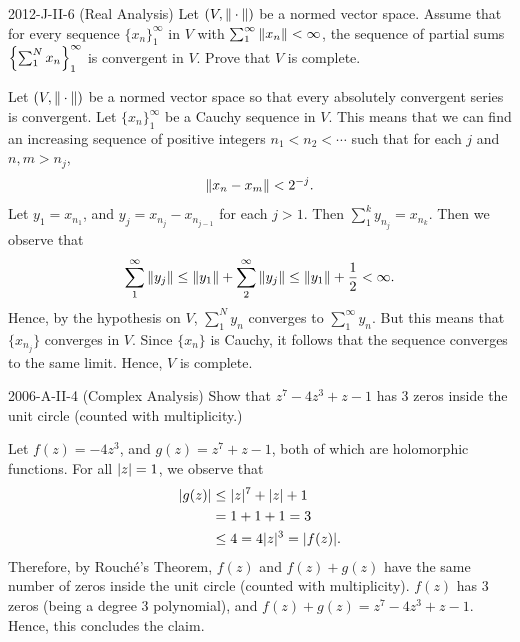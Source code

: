 \documentclass{article}
\begin{document}
\begin{prb}{2012-J-II-6 (Real Analysis)}
	Let $(V, \norm{\empspace})$ be a normed vector space. Assume that for every sequence $\{x_{n}\}_{1}^{\infty}$ in $V$ with $\sum_{1}^{\infty}\norm{x_{n}} < \infty$, the sequence of partial sums $\brac*{\sum_{1}^{N}x_{n}}_{1}^{\infty}$ is convergent in $V$. Prove that $V$ is complete. 
\end{prb}
\begin{solutions}
	Let $(V, \norm{\empspace})$ be a normed vector space so that every absolutely convergent series is convergent. Let $\{x_{n}\}_{1}^{\infty}$ be a Cauchy sequence in $V$. This means that we can find an increasing sequence of positive integers $n_{1} < n_{2} < \dotsm$ such that for each $j$ and $n,m > n_{j}$, 
		\begin{equation}
			\norm{x_{n} - x_{m}} < 2^{-j}. 
		\end{equation}
	Let $y_{1} = x_{n_{1}}$, and $y_{j} = x_{n_{j}} - x_{n_{j -1}}$ for each $j > 1$. Then $\sum_{1}^{k}y_{n_{j}} = x_{n_{k}}$. Then we observe that 
		\begin{equation}
			\sum_{1}^{\infty}\norm{y_{j}} \leq \norm{y_{1}} + \sum_{2}^{\infty}\norm{y_{j}} \leq \norm{y_{1}} + \frac{1}{2} < \infty. 
		\end{equation}
	Hence, by the hypothesis on $V$, $\sum_{1}^{N}y_{n}$ converges to $\sum_{1}^{\infty}y_{n}$. But this means that $\{x_{n_{j}}\}$ converges in $V$. Since $\{x_{n}\}$ is Cauchy, it follows that the sequence converges to the same limit. Hence, $V$ is complete. 
\end{solutions}
\begin{prb}{2006-A-II-4 (Complex Analysis)}
	Show that $z^{7} - 4z^{3} + z - 1$ has 3 zeros inside the unit circle (counted with multiplicity.)
\end{prb}
\begin{solutions}
	Let $f(z) = -4z^{3}$, and $g(z) = z^{7} + z - 1$, both of which are holomorphic functions. For all $\abs{z} = 1$, we observe that 
		\begin{align}
			\begin{split} 
				\abs{g(z)} &\leq |z|^{7} + |z| + 1 \\
				&= 1 + 1 + 1 = 3 \\
				&\leq 4 = 4|z|^{3} = |f(z)|. 
			\end{split}
		\end{align}
	Therefore, by Rouch{\'e}'s Theorem, $f(z)$ and $f(z) + g(z)$ have the same number of zeros inside the unit circle (counted with multiplicity). $f(z)$ has 3 zeros (being a degree 3 polynomial), and $f(z) + g(z) = z^{7} - 4z^{3} + z - 1$. Hence, this concludes the claim. 
\end{solutions}
\end{document}
